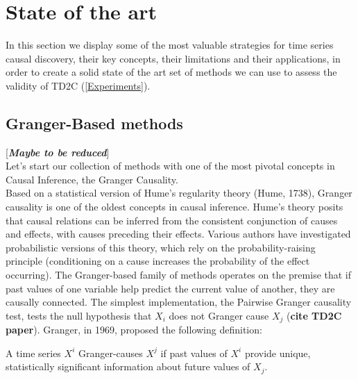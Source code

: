 \chapter{State of the art}\label{State-of-the-art Methods}
In this section we display some of the most valuable strategies for time series causal discovery, their key concepts, their limitations and their applications, in order to create a solid state of the art set of methods we can use to assess the validity of TD2C (\ref{Experiments}).\\

\section{Granger-Based methods}[\textbf{\textit{Maybe to be reduced}}]\\
Let's start our collection of methods with one of the most pivotal concepts in Causal Inference, the Granger Causality.\\

Based on a statistical version of Hume's regularity theory (Hume, 1738), Granger causality is one of the oldest concepts in causal inference. Hume's theory posits that causal relations can be inferred from the consistent conjunction of causes and effects, with causes preceding their effects. Various authors have investigated probabilistic versions of this theory, which rely on the probability-raising principle (conditioning on a cause increases the probability of the effect occurring). The Granger-based family of methods operates on the premise that if past values of one variable help predict the current value of another, they are causally connected. The simplest implementation, the Pairwise Granger causality test, tests the null hypothesis that $X_i$ does not Granger cause $X_j$ (\textbf{cite TD2C paper}). Granger, in 1969, proposed the following definition:

\begin{definition}
    A time series $X^i$ Granger-causes $X^j$ if past values of $X^i$ provide unique, statistically significant information about future values of $X_j$.
\end{definition}

